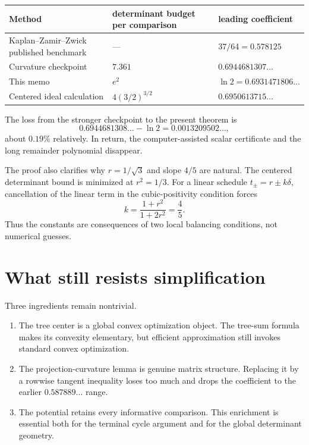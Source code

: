 \documentclass[11pt]{article}
\theoremstyle{definition}
\newcommand{\1}{\mathbf{1}}
\begin{document}
\begin{center}
\small
\begin{tabular}{@{}>{\raggedright\arraybackslash}p{}
                    >{\centering\arraybackslash}p{}
                    >{\centering\arraybackslash}p{}@{}}
\toprule
Method & determinant budget per comparison & leading coefficient \\
\midrule
Kaplan--Zamir--Zwick published benchmark & --- & $37/64=0.578125$ \\
Curvature checkpoint \cite{NashCurvature2026} & $7.361$ & $0.6944681307\ldots$ \\
This memo & $e^2$ & $\ln2=0.6931471806\ldots$ \\
Centered ideal calculation & $4(3/2)^{3/2}$ & $0.6950613715\ldots$ \\
\bottomrule
\end{tabular}
\end{center}

The loss from the stronger checkpoint to the present theorem is
\[
0.6944681308\ldots-\ln2
=0.0013209502\ldots,
\]
about $0.19\%$ relatively.  In return, the computer-assisted scalar certificate and the long remainder polynomial disappear.

The proof also clarifies why $r=1/\sqrt3$ and slope $4/5$ are natural.  The centered determinant bound is minimized at $r^2=1/3$.  For a linear schedule $t_\pm=r\pm k\delta$, cancellation of the linear term in the cubic-positivity condition forces
\[
k=\frac{1+r^2}{1+2r^2}=\frac45.
\]
Thus the constants are consequences of two local balancing conditions, not numerical guesses.

\section{What still resists simplification}

Three ingredients remain nontrivial.

\begin{enumerate}[label=\textbf{\arabic*.},leftmargin=2.3em]
\item The tree center is a global convex optimization object.  The tree-sum formula makes its convexity elementary, but efficient approximation still invokes standard convex optimization.
\item The projection-curvature lemma is genuine matrix structure.  Replacing it by a rowwise tangent inequality loses too much and drops the coefficient to the earlier $0.587889\ldots$ range.
\item The potential retains every informative comparison.  This enrichment is essential both for the terminal cycle argument and for the global determinant geometry.
\end{enumerate}
\end{document}
